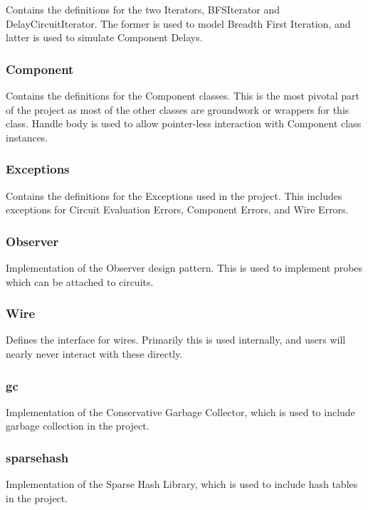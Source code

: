 \documentclass{article}
\begin{document}
Contains the definitions for the two Iterators, BFSIterator and DelayCircuitIterator. The former is used to model Breadth First Iteration, and latter is used to simulate Component Delays.

\subsubsection{Component}

Contains the definitions for the Component classes. This is the most pivotal part of the project as most of the other classes are groundwork or wrappers for this class. Handle body is used to allow pointer-less interaction with Component class instances.

\subsubsection{Exceptions}

Contains the definitions for the Exceptions used in the project. This includes exceptions for Circuit Evaluation Errors, Component Errors, and Wire Errors.

\subsubsection{Observer}

Implementation of the Observer design pattern. This is used to implement probes which can be attached to circuits.

\subsubsection{Wire}

Defines the interface for wires. Primarily this is used internally, and users will nearly never interact with these directly.

\subsubsection{gc}

Implementation of the Conservative Garbage Collector, which is used to include garbage collection in the project.\cite{gc}

\subsubsection{sparsehash}

Implementation of the Sparse Hash Library, which is used to include hash tables in the project.\cite{sparsehash}
\end{document}
